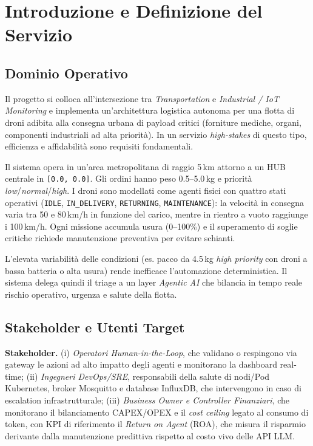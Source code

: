 
\chapter{Introduzione e Definizione del Servizio}
\label{cap:introduzione_definizione}

\section{Dominio Operativo}
\label{sec:dominio_operativo}

Il progetto si colloca all'intersezione tra \textit{Transportation} e \textit{Industrial / IoT Monitoring} e implementa un'architettura logistica autonoma per una flotta di droni adibita alla consegna urbana di payload critici (forniture mediche, organi, componenti industriali ad alta priorità). In un servizio \textit{high-stakes} di questo tipo, efficienza e affidabilità sono requisiti fondamentali.

Il sistema opera in un'area metropolitana di raggio 5\,km attorno a un HUB centrale in \texttt{[0.0, 0.0]}. Gli ordini hanno peso 0.5--5.0\,kg e priorità \textit{low}/\textit{normal}/\textit{high}. I droni sono modellati come agenti fisici con quattro stati operativi (\texttt{IDLE}, \texttt{IN\_DELIVERY}, \texttt{RETURNING}, \texttt{MAINTENANCE}): la velocità in consegna varia tra 50 e 80\,km/h in funzione del carico, mentre in rientro a vuoto raggiunge i 100\,km/h. Ogni missione accumula usura (0--100\%) e il superamento di soglie critiche richiede manutenzione preventiva per evitare schianti.

L'elevata variabilità delle condizioni (es. pacco da 4.5\,kg \textit{high priority} con droni a bassa batteria o alta usura) rende inefficace l'automazione deterministica. Il sistema delega quindi il triage a un layer \textit{Agentic AI} che bilancia in tempo reale rischio operativo, urgenza e salute della flotta.

\section{Stakeholder e Utenti Target}
\label{sec:stakeholder_utenti}

\textbf{Stakeholder.} (i) \textit{Operatori Human-in-the-Loop}, che validano o respingono via gateway le azioni ad alto impatto degli agenti e monitorano la dashboard real-time; (ii) \textit{Ingegneri DevOps/SRE}, responsabili della salute di nodi/Pod Kubernetes, broker Mosquitto e database InfluxDB, che intervengono in caso di escalation infrastrutturale; (iii) \textit{Business Owner e Controller Finanziari}, che monitorano il bilanciamento CAPEX/OPEX e il \textit{cost ceiling} legato al consumo di token, con KPI di riferimento il \textit{Return on Agent} (ROA), che misura il risparmio derivante dalla manutenzione predittiva rispetto al costo vivo delle API LLM.

